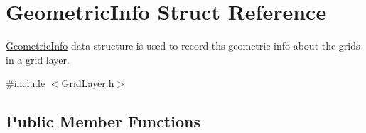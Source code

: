 \hypertarget{structGeometricInfo}{\section{\-Geometric\-Info \-Struct \-Reference}
\label{structGeometricInfo}
}


\hyperlink{structGeometricInfo}{\-Geometric\-Info} data structure is used to record ths geometric info about the grids in a grid layer.  




{\ttfamily \#include $<$\-Grid\-Layer.\-h$>$}

\subsection*{\-Public \-Member \-Functions}

